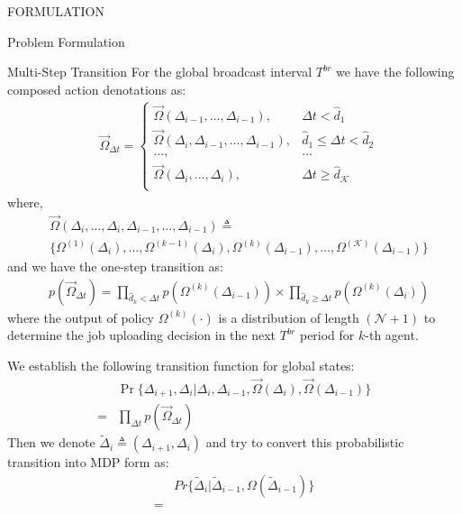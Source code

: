 \documentclass[10pt, conference, letterpaper]{IEEEtran}
\begin{document}
\begin{section}{FORMULATION}
\begin{subsection}{Problem Formulation}
\begin{subsubsection}{Multi-Step Transition}
                For the global broadcast interval $T^{br}$ we have the following composed action denotations as:
                \begin{align}
                    &\vec{\Omega}_{\Delta{t}} = 
                    \begin{cases}
                        \vec{\Omega}(\Delta_{i-1}, \dots, \Delta_{i-1}), & \Delta{t} < \hat{d}_1 \\
                        \vec{\Omega}(\Delta_{i},\Delta_{i-1}, \dots, \Delta_{i-1}), & \hat{d}_1 \leq \Delta{t}< \hat{d}_2 \\
                        \dots, & \dots \\
                        \vec{\Omega}(\Delta_{i}, \dots, \Delta_{i}), & \Delta{t} \geq \hat{d}_{\mathcal{K}} \\
                    \end{cases}
                \end{align}
                where,
                \begin{align}
                    &\vec{\Omega}(\Delta_{i}, \dots, \Delta_{i}, \Delta_{i-1}, \dots, \Delta_{i-1}) \triangleq \nonumber\\
                    & \{\Omega^{(1)}(\Delta_{i}), \dots, \Omega^{(k-1)}(\Delta_{i}),\Omega^{(k)}(\Delta_{i-1}), \dots, \Omega^{(\mathcal{K})}(\Delta_{i-1})\}
                \end{align}
                and we have the one-step transition as:
                \begin{align}
                    & p(\vec{\Omega}_{\Delta{t}})
                    = \prod_{\hat{d}_k<\Delta{t}}{ p(\Omega^{(k)}(\Delta_{i-1})) }
                            \times
                            \prod_{\hat{d}_k\geq\Delta{t}}{ p(\Omega^{(k)}(\Delta_{i})) }
                \end{align}
                where the output of policy $\Omega^{(k)}(\cdot)$ is a distribution of length $(\mathcal{N}+1)$ to determine the job uploading decision in the next $T^{br}$ period for $k$-th agent.

                We establish the following transition function for global states:
                \begin{align}
                    & \Pr\{\Delta_{i+1}, \Delta_{i} | \Delta_{i}, \Delta_{i-1}, \vec{\Omega}(\Delta_i), \vec{\Omega}(\Delta_{i-1})\} \nonumber\\
                    = & \prod_{\Delta{t}} p(\vec{\Omega}_{\Delta{t}})
                \end{align}
                Then we denote $\tilde{\Delta}_{i} \triangleq (\Delta_{i+1}, \Delta_{i})$ and try to convert this probabilistic transition into MDP form as:
                \begin{align}
                    & Pr\{ \tilde{\Delta}_i | \tilde{\Delta}_{i-1}, \Omega(\tilde{\Delta}_{i-1}) \} \nonumber\\
                    = & 
                \end{align}


\end{subsubsection}
\end{subsection}
\end{section}
\end{document}
